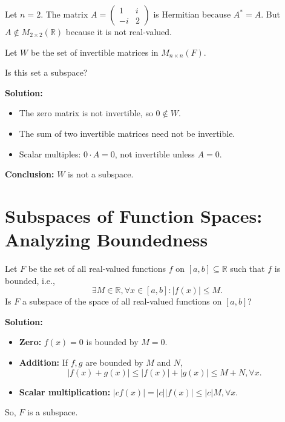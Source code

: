 \documentclass[11pt,a4paper]{article}
\theoremstyle{definition}
\theoremstyle{plain}
\theoremstyle{remark}
\begin{document}
\begin{additional_example}
Let $n = 2$. The matrix $A = \begin{pmatrix} 1 & i \\ -i & 2 \end{pmatrix}$ is Hermitian because $A^* = A$. But $A \notin M_{2\times 2}(\mathbb{R})$ because it is not real-valued.
\end{additional_example}

\begin{original_example}[title=Set of Invertible Matrices]
Let $W$ be the set of invertible matrices in $M_{n\times n}(F)$.

Is this set a subspace?

\textbf{Solution:}
\begin{itemize}
    \item The zero matrix is not invertible, so $0 \notin W$.
    \item The sum of two invertible matrices need not be invertible.
    \item Scalar multiples: $0 \cdot A = 0$, not invertible unless $A = 0$.
\end{itemize}
\textbf{Conclusion:} $W$ is not a subspace.
\end{original_example}

\section{Subspaces of Function Spaces: Analyzing Boundedness}

\begin{original_example}[title=Space of Bounded Functions]
Let $F$ be the set of all real-valued functions $f$ on $[a,b] \subseteq \mathbb{R}$ such that $f$ is bounded, i.e., 
\[
    \exists M \in \mathbb{R}, \forall x \in [a,b]: |f(x)| \le M.
\]
Is $F$ a subspace of the space of all real-valued functions on $[a,b]$?

\textbf{Solution:} 
\begin{itemize}
    \item \textbf{Zero:} $f(x) = 0$ is bounded by $M=0$.
    \item \textbf{Addition:} If $f, g$ are bounded by $M$ and $N$,
    \[
    |f(x) + g(x)| \le |f(x)| + |g(x)| \le M+N, \forall x.
    \]
    \item \textbf{Scalar multiplication:} $|c f(x)| = |c| |f(x)| \le |c| M, \forall x$.
\end{itemize}
So, $F$ is a subspace.
\end{original_example}
\end{document}
